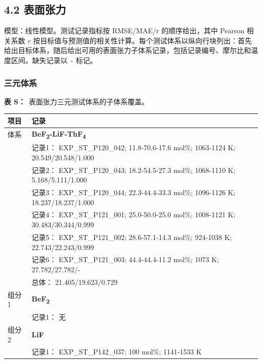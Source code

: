 \documentclass[12pt]{article}
\providecommand{\passthrough}[1]{#1}
\renewcommand{\thetable}{S\arabic{table}}
\newcommand{\sitablecaption}[1]{\Needspace{12\baselineskip}\par\noindent\stepcounter{table}\textbf{表 \thetable：}~#1\par\nobreak\smallskip}
\newcommand{\silongtablecaption}[1]{\sitablecaption{#1}\addtocounter{table}{-1}}
\begin{document}
\subsection*{4.2 表面张力}\label{surface-tension}

模型：线性模型。测试记录指标按 RMSE/MAE/r 的顺序给出，其中 Pearson 相关系数 \(r\) 按目标值与预测值的相关性计算。每个测试体系以纵向行块列出：首先给出目标体系，随后给出可用的表面张力子体系记录，包括记录编号、摩尔比和温度区间。缺失记录以 \passthrough{\lstinline!-!} 标记。

\subsubsection*{三元体系}\label{ternary-system-3}

{
\silongtablecaption{表面张力三元测试体系的子体系覆盖。}
\begin{longtable}[]{@{}
  >{\raggedright\arraybackslash}p{}
  >{\raggedright\arraybackslash}p{}@{}}
\toprule\noalign{}
\begin{minipage}[b]{\linewidth}\raggedright
项目
\end{minipage} & \begin{minipage}[b]{\linewidth}\raggedright
记录
\end{minipage} \\
\midrule\noalign{}
\endhead
\bottomrule\noalign{}
\endlastfoot
体系 & \textbf{BeF\textsubscript{2}-LiF-ThF\textsubscript{4}} \\
 & 记录1： EXP\_ST\_P120\_042; 11.8-70.6-17.6 mol\%; 1063-1124 K; 20.549/20.548/1.000 \\
 & 记录2： EXP\_ST\_P120\_043; 18.2-54.5-27.3 mol\%; 1068-1110 K; 5.168/5.111/1.000 \\
 & 记录3： EXP\_ST\_P120\_044; 22.3-44.4-33.3 mol\%; 1096-1126 K; 18.237/18.237/1.000 \\
 & 记录4： EXP\_ST\_P121\_001; 25.0-50.0-25.0 mol\%; 1008-1121 K; 30.483/30.344/0.999 \\
 & 记录5： EXP\_ST\_P121\_002; 28.6-57.1-14.3 mol\%; 924-1038 K; 22.743/22.243/0.999 \\
 & 记录6： EXP\_ST\_P121\_003; 44.4-44.4-11.2 mol\%; 1073 K; 27.782/27.782/- \\
 & 总体： 21.405/19.623/0.729  \\

组分 1 & \textbf{BeF\textsubscript{2}} \\
 & 记录1： 无 \\
组分 2  & \textbf{LiF} \\
 & 记录1： EXP\_ST\_P142\_037; 100 mol\%; 1141-1533 K  \\


\end{longtable}}
\end{document}

